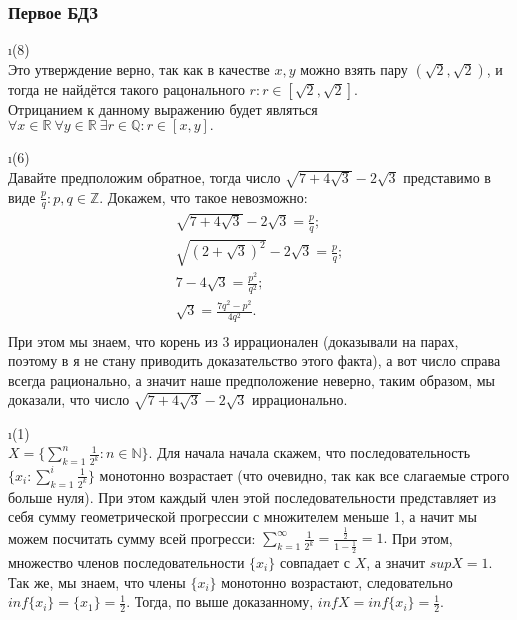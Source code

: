 \subsubsection{Первое БДЗ}

\i(8)\\
Это утверждение верно, так как в качестве $x, y$ можно взять пару $(\sqrt{2}, \sqrt{2})$, и тогда не найдётся такого рацонального $r: r \in [\sqrt{2}, \sqrt{2}]$.\\
Отрицанием к данному выражению будет являться $\forall x \in \mathds{R} \ \forall y \in \mathds{R} \ \exists r \in \mathds{Q}: r \in [x, y].$

\i(6)\\
Давайте предположим обратное, тогда число $\sqrt{7+4\sqrt{3}} - 2\sqrt{3}$ представимо в виде $\frac{p}{q}: p, q \in \mathds{Z}$. Докажем, что такое невозможно:
\begin{gather*}
    \sqrt{7+4\sqrt{3}} - 2\sqrt{3} = \frac{p}{q};\\
    \sqrt{(2+\sqrt{3})^2} - 2\sqrt{3} = \frac{p}{q};\\
    7 - 4\sqrt{3} = \frac{p^2}{q^2};\\
    \sqrt{3} = \frac{7q^2-p^2}{4q^2}.\\
\end{gather*}
При этом мы знаем, что корень из 3 иррационален (доказывали на парах, поэтому в я не стану приводить доказательство этого факта), а вот число справа всегда рационально, а значит наше предположение неверно, таким образом, мы доказали, что число $\sqrt{7+4\sqrt{3}} - 2\sqrt{3}$ иррационально.

\i (1)\\
$X = \{\sum\limits_{k=1}^n\frac{1}{2^k}: n \in \mathds{N}\}$. Для начала начала скажем, что последовательность $\{x_i:\sum\limits_{k=1}^i\frac{1}{2^k}\}$ монотонно возрастает (что очевидно, так как все слагаемые строго больше нуля). При этом каждый член этой последовательности представляет из себя сумму геометрической прогрессии с множителем меньше 1, а начит мы можем посчитать сумму всей прогресси: $\sum\limits_{k=1}^{\infty}\frac{1}{2^k} = \frac{\frac{1}{2}}{1-\frac{1}{2}} = 1.$ При этом, множество членов последовательности $\{x_i\}$ совпадает с $X$, а значит $supX = 1$. Так же, мы знаем, что члены $\{x_i\}$ монотонно возрастают, следовательно $inf\{x_i\} = \{x_1\} = \frac{1}{2}$. Тогда, по выше доказанному, $infX = inf\{x_i\} = \frac{1}{2}$. 

